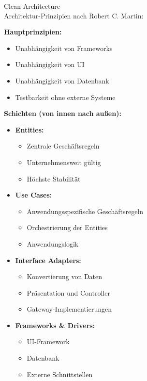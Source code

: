 \begin{concept}{Clean Architecture}\\
Architektur-Prinzipien nach Robert C. Martin:

\textbf{Hauptprinzipien:}
\begin{itemize}
    \item Unabhängigkeit von Frameworks
    \item Unabhängigkeit von UI
    \item Unabhängigkeit von Datenbank
    \item Testbarkeit ohne externe Systeme
\end{itemize}

\textbf{Schichten (von innen nach außen):}
\begin{itemize}
    \item \textbf{Entities:} 
    \begin{itemize}
        \item Zentrale Geschäftsregeln
        \item Unternehmensweit gültig
        \item Höchste Stabilität
    \end{itemize}
    
    \item \textbf{Use Cases:}
    \begin{itemize}
        \item Anwendungsspezifische Geschäftsregeln
        \item Orchestrierung der Entities
        \item Anwendungslogik
    \end{itemize}
    
    \item \textbf{Interface Adapters:}
    \begin{itemize}
        \item Konvertierung von Daten
        \item Präsentation und Controller
        \item Gateway-Implementierungen
    \end{itemize}
    
    \item \textbf{Frameworks \& Drivers:}
    \begin{itemize}
        \item UI-Framework
        \item Datenbank
        \item Externe Schnittstellen
    \end{itemize}
\end{itemize}
\end{concept}

